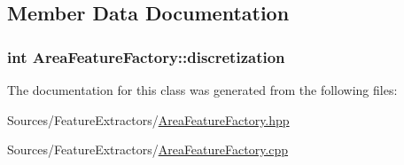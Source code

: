 \subsection{Member Data Documentation}
\hypertarget{class_area_feature_factory_a77f36879829aeb6c25e7da509649b1ef}{
\subsubsection[{discretization}]{\setlength{\rightskip}{0pt plus 5cm}int Area\+Feature\+Factory\+::discretization\hspace{0.3cm}{\ttfamily [private]}}}\label{class_area_feature_factory_a77f36879829aeb6c25e7da509649b1ef}


The documentation for this class was generated from the following files\+:\begin{DoxyCompactItemize}
\item 
Sources/\+Feature\+Extractors/\hyperlink{_area_feature_factory_8hpp}{Area\+Feature\+Factory.\+hpp}\item 
Sources/\+Feature\+Extractors/\hyperlink{_area_feature_factory_8cpp}{Area\+Feature\+Factory.\+cpp}\end{DoxyCompactItemize}
